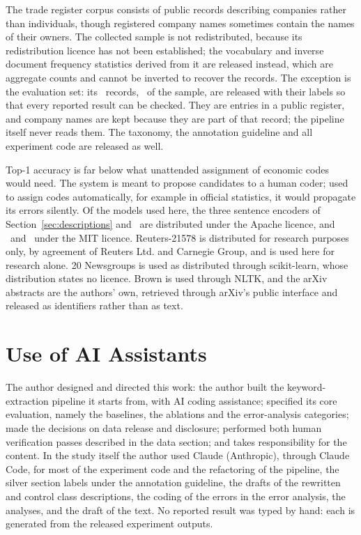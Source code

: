 \documentclass[11pt]{article}
\begin{document}
The trade register corpus consists of public records describing companies rather
than individuals, though registered company names sometimes contain the names of
their owners. The collected sample is not redistributed, because its
redistribution licence has not been established; the vocabulary and inverse
document frequency statistics derived from it are released instead, which are
aggregate counts and cannot be inverted to recover the records. The exception
is the evaluation set: its \NEVAL\ records, \EvalShareOfCorpus\ of the sample, are
released with their labels so that every reported result can be checked. They
are entries in a public register, and company names are kept because they are
part of that record; the pipeline itself never reads them. The taxonomy, the
annotation guideline and all experiment code are released as well.

Top-1 accuracy is far below what unattended assignment of economic codes would
need. The system is meant to propose candidates to a human coder; used to
assign codes automatically, for example in official statistics, it would
propagate its errors silently. Of the models used here, the three sentence
encoders of Section~\ref{sec:descriptions} and \LLMModel\ are distributed
under the Apache licence, and \BgeModel\ and \LLMTwoModel\ under the MIT
licence. Reuters-21578 is distributed for research
purposes only, by agreement of Reuters Ltd. and Carnegie Group, and is used
here for research alone. 20 Newsgroups is used as distributed through
scikit-learn, whose distribution states no licence. Brown is used through NLTK,
and the arXiv abstracts are the authors' own, retrieved through arXiv's public
interface and released as identifiers rather than as text.

\section*{Use of AI Assistants}

The author designed and directed this work: the author built the
keyword-extraction pipeline it starts from, with AI coding assistance; specified
its core evaluation, namely the baselines, the ablations and the error-analysis
categories; made the decisions on data release and disclosure; performed both
human verification passes described in the data section; and takes
responsibility for the content. In the study itself the author used Claude
(Anthropic), through Claude Code, for most of the experiment code and the
refactoring of the pipeline, the silver section labels under the annotation
guideline, the drafts of the rewritten and control class descriptions, the
coding of the errors in the error analysis, the analyses, and the draft of the
text.
No reported result was typed by hand: each is generated from the released
experiment outputs.
\end{document}
